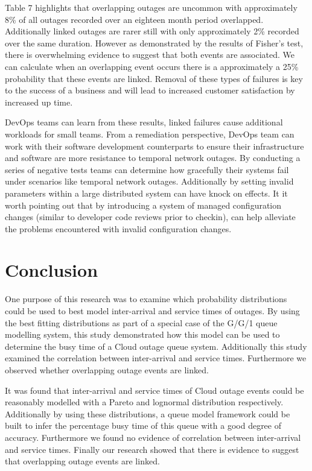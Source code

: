 \documentclass[5p]{elsarticle}
\begin{document}
Table 7 highlights that overlapping outages are uncommon with approximately 8\% of all outages recorded over an eighteen month period overlapped. Additionally linked outages are rarer still with only approximately 2\% recorded over the same duration. However as demonstrated by the results of Fisher's test, there is overwhelming evidence to suggest that both events are associated. We can calculate when an overlapping event occurs there is a approximately a 25\% probability that these events are linked. Removal of these types of failures is key to the success of a business and will lead to increased customer satisfaction by increased up time. 

DevOps teams can learn from these results, linked failures cause additional workloads for small teams. From a remediation perspective, DevOps team can work with their software development counterparts to ensure their infrastructure and software are more resistance to temporal network outages. By conducting a series of negative tests teams can determine how gracefully their systems fail under scenarios like temporal network outages. Additionally by setting invalid parameters within a large distributed system can have knock on effects. It it worth pointing out that by introducing a system of managed configuration changes (similar to developer code reviews prior to checkin), can help alleviate the problems encountered with invalid configuration changes.

\section{Conclusion}

One purpose of this research was to examine which probability distributions could be used to best model inter-arrival and service times of outages. By using the best fitting distributions as part of a special case of the G/G/1 queue modelling system, this study demonstrated how this model can be used to determine the busy time of a Cloud outage queue system. Additionally this study examined the correlation between inter-arrival and service times. Furthermore we observed whether overlapping outage events are  linked.

It was found that inter-arrival and service times of Cloud outage events could be reasonably modelled with a Pareto and lognormal distribution respectively. Additionally by using these distributions, a queue model framework could be built to infer the percentage busy time of this queue with a good degree of accuracy. Furthermore we found no evidence of correlation between inter-arrival and service times. Finally our research showed that there is evidence to suggest that overlapping outage events are linked.
\end{document}
